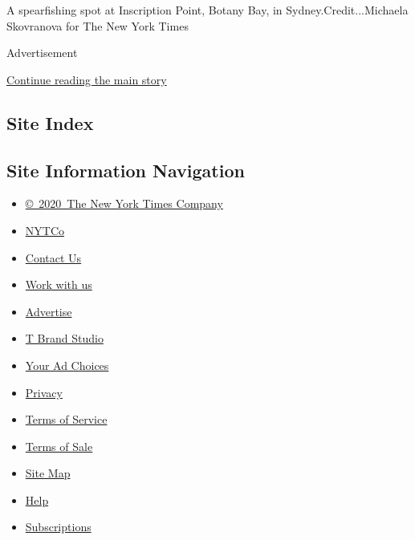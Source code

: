 A spearfishing spot at Inscription Point, Botany Bay, in
Sydney.Credit...Michaela Skovranova for The New York Times

Advertisement

\protect\hyperlink{after-bottom}{Continue reading the main story}

\hypertarget{site-index}{%
\subsection{Site Index}\label{site-index}}

\hypertarget{site-information-navigation}{%
\subsection{Site Information
Navigation}\label{site-information-navigation}}

\begin{itemize}
\tightlist
\item
  \href{https://help.nytimes3xbfgragh.onion/hc/en-us/articles/115014792127-Copyright-notice}{©~2020~The
  New York Times Company}
\end{itemize}

\begin{itemize}
\tightlist
\item
  \href{https://www.nytco.com/}{NYTCo}
\item
  \href{https://help.nytimes3xbfgragh.onion/hc/en-us/articles/115015385887-Contact-Us}{Contact
  Us}
\item
  \href{https://www.nytco.com/careers/}{Work with us}
\item
  \href{https://nytmediakit.com/}{Advertise}
\item
  \href{http://www.tbrandstudio.com/}{T Brand Studio}
\item
  \href{https://www.nytimes3xbfgragh.onion/privacy/cookie-policy\#how-do-i-manage-trackers}{Your
  Ad Choices}
\item
  \href{https://www.nytimes3xbfgragh.onion/privacy}{Privacy}
\item
  \href{https://help.nytimes3xbfgragh.onion/hc/en-us/articles/115014893428-Terms-of-service}{Terms
  of Service}
\item
  \href{https://help.nytimes3xbfgragh.onion/hc/en-us/articles/115014893968-Terms-of-sale}{Terms
  of Sale}
\item
  \href{https://spiderbites.nytimes3xbfgragh.onion}{Site Map}
\item
  \href{https://help.nytimes3xbfgragh.onion/hc/en-us}{Help}
\item
  \href{https://www.nytimes3xbfgragh.onion/subscription?campaignId=37WXW}{Subscriptions}
\end{itemize}
